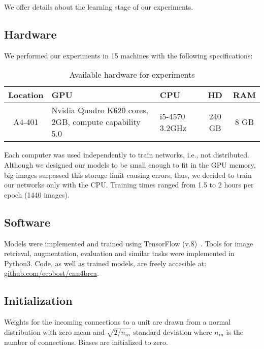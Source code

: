We offer details about the learning stage of our experiments.

\subsection{Hardware}
We performed our experiments in 15 machines with the following specifications:
\begin{table}[h]
	\centering
	\begin{tabular}{cp{3.8cm}p{1.8cm}cc}
	\hline
	\textbf{Location}	& \textbf{GPU}	& \textbf{CPU} &\textbf{HD}	& \textbf{RAM}\\
	\hline
	A4-401 & Nvidia Quadro K620 \newline 384 cores, 2GB, compute capability 5.0 & i5-4570 \newline 3.2GHz	& 240 GB & 8 GB\\
	\hline
	\end{tabular}
	\caption{Available hardware for experiments}
\end{table}

Each computer was used independently to train networks, i.e., not distributed. Although we designed our models to be small enough to fit in the GPU memory, big images surpassed this storage limit causing errors; thus, we decided to train our networks only with the CPU. Training times ranged from 1.5 to 2 hours per epoch (1440 images).

\subsection{Software}
Models were implemented and trained using TensorFlow (v.8)~\cite{Abadi2015}. Tools for image retrieval, augmentation, evaluation and similar tasks were implemented in Python3.
Code, as well as trained models, are freely accesible at: \url{github.com/ecobost/cnn4brca}.

\subsection{Initialization}
Weights for the incoming connections to a unit are drawn from a normal distribution with zero mean and $\sqrt{2/n_{in}}$ standard deviation where $n_{in}$ is the number of connections. Biases are initialized to zero.

